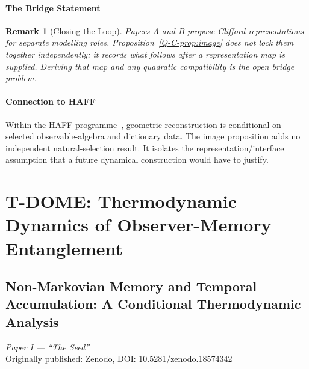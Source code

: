 \documentclass[12pt,a4paper,openany]{book}
\newtheorem{remark}[theorem]{Remark}
\begin{document}
\subsection{The Bridge Statement}

\begin{remark}[Closing the Loop]
Papers A and B propose Clifford representations for separate modelling roles.  Proposition~\ref{Q-C-prop:image} does not lock them together independently; it records what follows after a representation map is supplied.  Deriving that map and any quadratic compatibility is the open bridge problem.
\end{remark}

\subsection{Connection to HAFF}

Within the HAFF programme~\cite{Liu2026PaperA,Liu2026PaperB}, geometric reconstruction is conditional on selected observable-algebra and dictionary data.  The image proposition adds no independent natural-selection result.  It isolates the representation/interface assumption that a future dynamical construction would have to justify.



\part{T-DOME: Thermodynamic Dynamics of Observer-Memory Entanglement}
\label{part:TDOME}

\chapter{Non-Markovian Memory and Temporal Accumulation: A Conditional Thermodynamic Analysis}
\label{T-chap:paperI}

\begin{center}
\textit{Paper I --- ``The Seed''}\\[0.5em]
Originally published: Zenodo, DOI: 10.5281/zenodo.18574342
\end{center}
\end{document}
